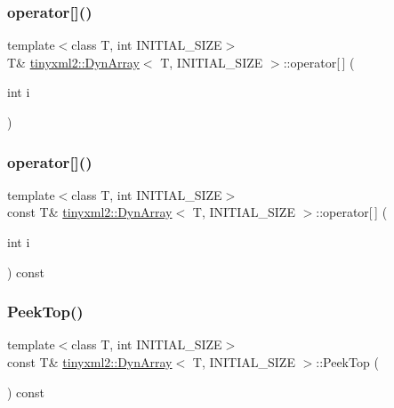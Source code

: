 \subsubsection{\texorpdfstring{operator[]()}{operator[]()}\hspace{0.1cm}{\footnotesize\ttfamily [1/2]}}
{\footnotesize\ttfamily template$<$class T, int I\+N\+I\+T\+I\+A\+L\+\_\+\+S\+I\+ZE$>$ \\
T\& \hyperlink{classtinyxml2_1_1_dyn_array}{tinyxml2\+::\+Dyn\+Array}$<$ T, I\+N\+I\+T\+I\+A\+L\+\_\+\+S\+I\+ZE $>$\+::operator\mbox{[}$\,$\mbox{]} (\begin{DoxyParamCaption}\item[{int}]{i }\end{DoxyParamCaption})\hspace{0.3cm}{\ttfamily [inline]}}

\mbox{\label{classtinyxml2_1_1_dyn_array_a474a5cd9bc97ea32b3dcef4c773125e1}} 
\subsubsection{\texorpdfstring{operator[]()}{operator[]()}\hspace{0.1cm}{\footnotesize\ttfamily [2/2]}}
{\footnotesize\ttfamily template$<$class T, int I\+N\+I\+T\+I\+A\+L\+\_\+\+S\+I\+ZE$>$ \\
const T\& \hyperlink{classtinyxml2_1_1_dyn_array}{tinyxml2\+::\+Dyn\+Array}$<$ T, I\+N\+I\+T\+I\+A\+L\+\_\+\+S\+I\+ZE $>$\+::operator\mbox{[}$\,$\mbox{]} (\begin{DoxyParamCaption}\item[{int}]{i }\end{DoxyParamCaption}) const\hspace{0.3cm}{\ttfamily [inline]}}

\mbox{\label{classtinyxml2_1_1_dyn_array_a5e4e1e408e646688503dec77c77c9d59}} 
\subsubsection{\texorpdfstring{Peek\+Top()}{PeekTop()}}
{\footnotesize\ttfamily template$<$class T, int I\+N\+I\+T\+I\+A\+L\+\_\+\+S\+I\+ZE$>$ \\
const T\& \hyperlink{classtinyxml2_1_1_dyn_array}{tinyxml2\+::\+Dyn\+Array}$<$ T, I\+N\+I\+T\+I\+A\+L\+\_\+\+S\+I\+ZE $>$\+::Peek\+Top (\begin{DoxyParamCaption}{ }\end{DoxyParamCaption}) const\hspace{0.3cm}{\ttfamily [inline]}}

